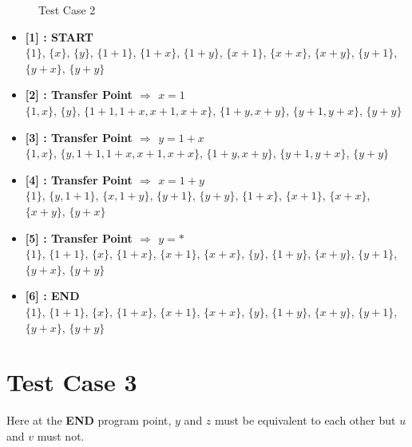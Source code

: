 \begin{figure}[H]
\label{fig:tc2}
    \caption{Test Case 2}
\end{figure}

\begin{itemize}

    \item \textbf{[1] : START}\\
        $\{1\}$, $\{x\}$, $\{y\}$, $\{1 + 1\}$, $\{1 + x\}$, $\{1 + y\}$, $\{x + 1\}$, $\{x + x\}$, $\{x + y\}$, $\{y + 1\}$, $\{y + x\}$, $\{y + y\}$

    \item \textbf{[2] : Transfer Point $\Rightarrow$ $x = 1$}\\
        $\{1, x\}$, $\{y\}$, $\{1 + 1, 1 + x, x + 1, x + x\}$, $\{1 + y, x + y\}$, $\{y + 1, y + x\}$, $\{y + y\}$

    \item \textbf{[3] : Transfer Point $\Rightarrow$ $y = 1 + x$}\\
        $\{1, x\}$, $\{y, 1 + 1, 1 + x, x + 1, x + x\}$, $\{1 + y, x + y\}$, $\{y + 1, y + x\}$, $\{y + y\}$

    \item \textbf{[4] : Transfer Point $\Rightarrow$ $x = 1 + y$}\\
        $\{1\}$, $\{y, 1 + 1\}$, $\{x, 1 + y\}$, $\{y + 1\}$, $\{y + y\}$, $\{1 + x\}$, $\{x + 1\}$, $\{x + x\}$, $\{x + y\}$, $\{y + x\}$

    \item \textbf{[5] : Transfer Point $\Rightarrow$ $y = *$}\\
        $\{1\}$, $\{1 + 1\}$, $\{x\}$, $\{1 + x\}$, $\{x + 1\}$, $\{x + x\}$, $\{y\}$, $\{1 + y\}$, $\{x + y\}$, $\{y + 1\}$, $\{y + x\}$, $\{y + y\}$

    \item \textbf{[6] : END}\\
        $\{1\}$, $\{1 + 1\}$, $\{x\}$, $\{1 + x\}$, $\{x + 1\}$, $\{x + x\}$, $\{y\}$, $\{1 + y\}$, $\{x + y\}$, $\{y + 1\}$, $\{y + x\}$, $\{y + y\}$

\end{itemize}

\section{Test Case 3}
\label{sec:tc3}
Here at the \textbf{END} program point, $y$ and $z$ must be equivalent to 
each other but $u$ and $v$ must not.

